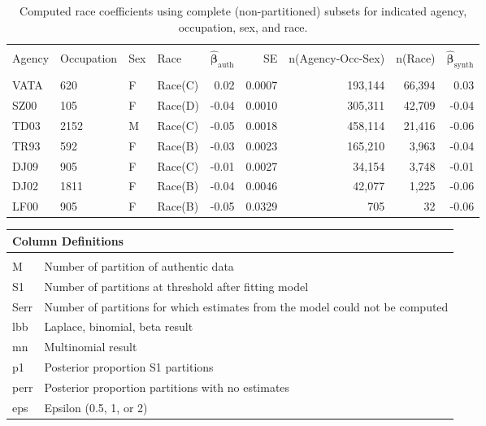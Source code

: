 \documentclass[10pt, letterpaper]{article}
\newcommand{\mest}[1]{\hat{\bm{#1}}}
\begin{document}
\begin{spacing}{1.0}
\begin{table}[h]
    \centering
    \caption{Computed race coefficients using complete (non-partitioned) subsets for indicated agency, occupation, sex, and race.}
    \begin{tabular}{llllrrrrr}
        \hline\\[-10pt]
        Agency & Occupation & Sex & Race & $\mest{\beta}_\text{auth}$ & SE & n(Agency-Occ-Sex) & n(Race) & $\mest{\beta}_\text{synth}$ \\ 
        \hline\\[-6pt]
        VATA & 620 & F & Race(C) & 0.02 & 0.0007 & 193,144 & 66,394 & 0.03 \\ 
        SZ00 & 105 & F & Race(D) & -0.04 & 0.0010 & 305,311 & 42,709 & -0.04 \\ 
        TD03 & 2152 & M & Race(C) & -0.05 & 0.0018 & 458,114 & 21,416 & -0.06 \\ 
        TR93 & 592 & F & Race(B) & -0.03 & 0.0023 & 165,210 & 3,963 & -0.04 \\ 
        DJ09 & 905 & F & Race(C) & -0.01 & 0.0027 & 34,154 & 3,748 & -0.01 \\ 
        DJ02 & 1811 & F & Race(B) & -0.04 & 0.0046 & 42,077 & 1,225 & -0.06 \\ 
        LF00 & 905 & F & Race(B) & -0.05 & 0.0329 & 705 & 32 & -0.06 \\ 
        \hline
    \end{tabular}
    \label{table:CoefficientFullSet}
\end{table}

\clearpage

\begin{table}[ht]
    \begin{tabular}{p{1in}p{5in}}
        \multicolumn{2}{l}{Column Definitions} \\
        \hline
        & \\
        M &  Number of partition of authentic data\\
        S1 & Number of partitions at threshold after fitting model \\
        Serr & Number of partitions for which estimates from the model could not be computed \\
        lbb & Laplace, binomial, beta result \\
        mn & Multinomial result \\
        p1 & Posterior proportion S1 partitions \\
        perr & Posterior proportion partitions with no estimates \\
        eps & Epsilon (0.5, 1, or 2) \\
    \end{tabular}
\end{table}


\end{spacing}
\end{document}
